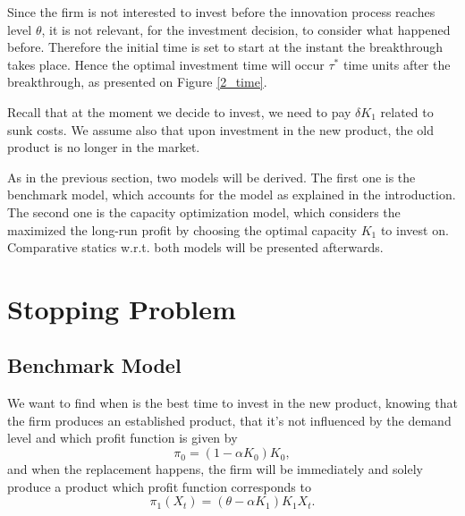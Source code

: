 Since the firm is not interested to invest before the innovation process reaches level $\theta$, it is not relevant, for the investment decision, to consider what happened before. Therefore the initial time is set to start at the instant the breakthrough takes place. %
Hence the optimal investment time will occur $\tau^*$ time units after the breakthrough, as presented on Figure \ref{2_time}.

Recall that at the moment we decide to invest, we need to pay $\delta K_1$ related to sunk costs. We assume also that upon investment in the new product, the old product is no longer in the market.



As in the previous section, two models will be derived. The first one is the benchmark model, which accounts for the model as explained in the introduction. The second one is the capacity optimization model, which considers the maximized the long-run profit by choosing the optimal capacity $K_1$ to invest on. Comparative statics w.r.t. both models will be presented afterwards.



\section{Stopping Problem}
\label{section:2_theory}



\subsection{Benchmark Model}
\label{subsec:2_bm}

We want to find when is the best time to invest in the new product, knowing that the firm produces an established product, that it's not influenced by the demand level and which profit function is given by 
\begin{equation}
\pi_0=(1-\alpha K_0)K_0,
\label{pi0}
\end{equation}
and when the replacement happens, the firm will be immediately and solely produce a product which profit function corresponds to
\begin{equation}
\pi_1(X_t) =(\theta-\alpha K_1)K_1 X_t.
\label{pi1}
\end{equation}

